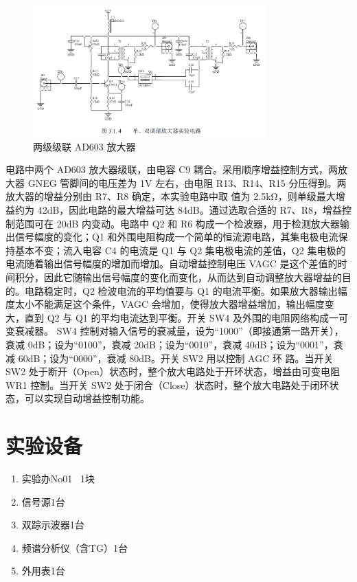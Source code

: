 \documentclass{../source/Experiment}
\begin{document}
        \begin{figure}[H]
            \centering
            \includegraphics[width = 0.8\textwidth]{pic/fig2.png}
            \caption{两级级联 AD603 放大器}
        \end{figure}

        电路中两个 AD603 放大器级联，由电容 C9 耦合。采用顺序增益控制方式，两放大器 GNEG 管脚间的电压差为 1V 左右，由电阻 R13、R14、R15 分压得到。两放大器的增益分别由 R7、R8 确定，本实验电路中取
        值为 2.5kΩ，则单级最大增益约为 42dB，因此电路的最大增益可达 84dB。通过选取合适的 R7、R8，增益控制范围可在 20dB 内变动。电路中 Q2 和 R6 构成一个检波器，用于检测放大器输出信号幅度的变化；Q1 和外围电阻构成一个简单的恒流源电路，其集电极电流保持基本不变；流入电容 C4 的电流是 Q1 与 Q2 集电极电流的差值，Q2 集电极的电流随着输出信号幅度的增加而增加。自动增益控制电压 VAGC 是这个差值的时间积分，因此它随输出信号幅度的变化而变化，从而达到自动调整放大器增益的目的。电路稳定时，Q2 检波电流的平均值要与 Q1 的电流平衡。如果放大器输出幅度太小不能满足这个条件，VAGC 会增加，使得放大器增益增加，输出幅度变大，直到 Q2 与 Q1 的平均电流达到平衡。开关 SW4 及外围的电阻网络构成一可变衰减器。
        SW4 控制对输入信号的衰减量，设为“1000”（即接通第一路开关），衰减 0dB；设为“0100”，衰减 20dB；设为“0010”，衰减 40dB；设为“0001”，衰减 60dB；设为“0000”，衰减 80dB。开关 SW2 用以控制 AGC 环
        路。当开关 SW2 处于断开（Open）状态时，整个放大电路处于开环状态，增益由可变电阻 WR1 控制。当开关 SW2 处于闭合（Close）状态时，整个放大电路处于闭环状态，可以实现自动增益控制功能。


    \section{实验设备}
        \begin{enumerate}
            \item 实验办No01 \, 1块
            \item 信号源1台
            \item 双踪示波器1台
            \item 频谱分析仪（含TG）1台
            \item 外用表1台
        \end{enumerate}
        
\end{document}
